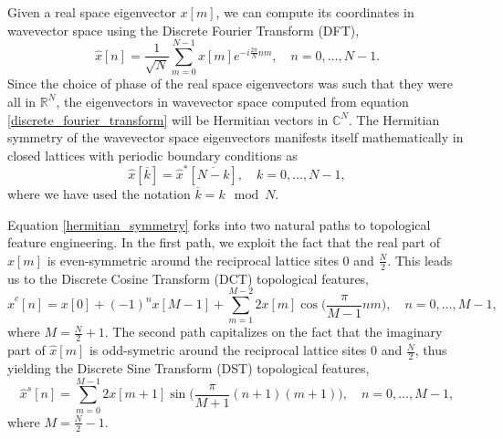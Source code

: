 \documentclass[10pt]{revtex4-1}
\begin{document}


Given a real space eigenvector $x[m]$, we can compute its coordinates in wavevector space using the Discrete Fourier Transform (DFT),  
\begin{equation}
\label{discrete_fourier_transform}
\hat{x}[n] = \frac{1}{\sqrt{N}}\sum_{m=0}^{N-1}x[m]e^{-i\frac{2\pi}{N}nm}, \quad n=0,\dots,N-1.
\end{equation}
Since the choice of phase of the real space eigenvectors was such that they were all in $\mathbb{R}^{N}$, the eigenvectors in wavevector space computed from equation \eqref{discrete_fourier_transform} will be Hermitian vectors in $\mathbb{C}^N$. The Hermitian symmetry of the wavevector space eigenvectors manifests itself mathematically in closed lattices with periodic boundary conditions as 
\begin{equation}
\label{hermitian_symmetry}
\hat{x}[\overline{k}] = \hat{x}^*[\overline{N-k}], \quad k = 0,\dots, N-1,
\end{equation}
where  we have used the notation $\overline{k} = k \mod N$. 

Equation \eqref{hermitian_symmetry} forks into two natural paths to topological feature engineering. In the first path, we exploit the fact that the real part of $\hat{x}[m]$ is even-symmetric around the reciprocal lattice sites $0$ and $\frac{N}{2}$. This leads us to the Discrete Cosine Transform (DCT) topological features,
\begin{equation}
\label{DCT}
\hat{x}^{c}[n] = x[0] + (-1)^n x[M-1] + \sum_{m=1}^{M-2} 2x[m]\cos\bigg(\frac{\pi}{M-1}nm\bigg), \quad n=0,\dots,M-1, 
\end{equation}
where $M = \frac{N}{2}+1$. The second path capitalizes on the fact that the imaginary part of $\hat{x}[m]$ is odd-symetric around the reciprocal lattice sites $0$ and $\frac{N}{2}$, thus yielding the Discrete Sine Transform (DST) topological features,
\begin{equation}
\label{DST}
\hat{x}^{s}[n] = \sum_{m=0}^{M-1} 2x[m+1]\sin\bigg(\frac{\pi}{M+1}(n+1)(m+1)\bigg), \quad n=0,\dots,M-1,
\end{equation} 
where $M = \frac{N}{2}-1$. 
\end{document}
